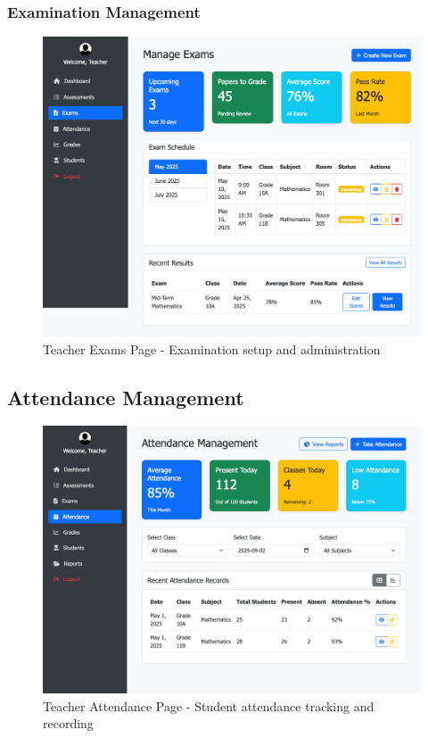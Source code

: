 \documentclass[12pt,a4paper]{article}
\begin{document}
\subsubsection{Examination Management}
\begin{figure}[H]
    \centering
    \includegraphics[width=\textwidth]{teacher/teacher-exams-page.png}
    \caption{Teacher Exams Page - Examination setup and administration}
    \label{fig:teacher-exams}
\end{figure}

\subsection{Attendance Management}
\begin{figure}[H]
    \centering
    \includegraphics[width=\textwidth]{teacher/teacher-attendance-page.png}
    \caption{Teacher Attendance Page - Student attendance tracking and recording}
    \label{fig:teacher-attendance}
\end{figure}
\end{document}
